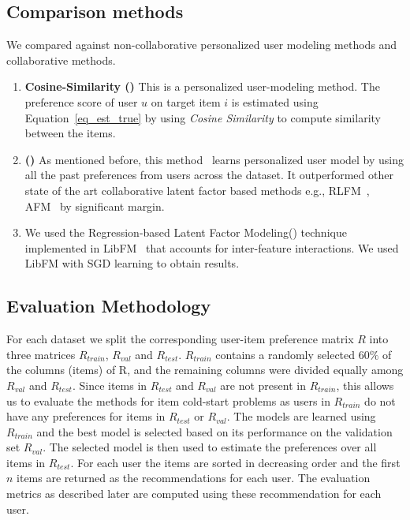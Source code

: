 

\subsection{Comparison methods} \label{other_methods}
We compared \CF against non-collaborative personalized user modeling methods and
collaborative methods.

\begin{enumerate}
  \item \textbf{Cosine-Similarity (\COSIM)}
       This is a personalized user-modeling method.
        The preference score of user $u$ on target item $i$ is estimated using
        Equation~\ref{eq_est_true} by using \emph{Cosine Similarity} to compute
        similarity between the items.
  \item{\textbf{\CFLINEXP (\CFLIN)}}
        As mentioned before, this method~\cite{elbadrawy2015} learns personalized user model
        by using all the past preferences from users across the dataset. It
        outperformed other state of the art collaborative latent factor based methods e.g.,
        RLFM~\cite{agarwal09},  AFM~\cite{gantner10} by significant margin.
  \item{\textbf{\RLFMI}}
        We used the Regression-based Latent Factor Modeling(\RLFM) technique
        implemented in LibFM~\cite{rendle12libfm} that accounts for inter-feature interactions. We
        used LibFM with SGD learning to obtain results.
\end{enumerate}




\subsection{Evaluation Methodology}
For each dataset we split the corresponding user-item preference matrix  $R$ into three
matrices $R_{train}$, $R_{val}$ and $R_{test}$. $R_{train}$ contains a randomly
selected $60\%$ of the columns (items) of R, and the remaining columns were divided equally
among $R_{val}$ and $R_{test}$. Since items in $R_{test}$ and $R_{val}$ are not
present in $R_{train}$, this allows us to evaluate the methods for item cold-start
problems as users in $R_{train}$ do not have any preferences for items in
$R_{test}$ or $R_{val}$. 
The models are learned using $R_{train}$ and the best model is
selected based on its performance on the validation set $R_{val}$. The selected model
is then used to estimate the preferences over all items in $R_{test}$. For each
user the items are sorted in decreasing order and the first $n$ items are returned
as the \TOPN recommendations for each user. The evaluation metrics as described
later are computed using these \TOPN recommendation for each user. 

